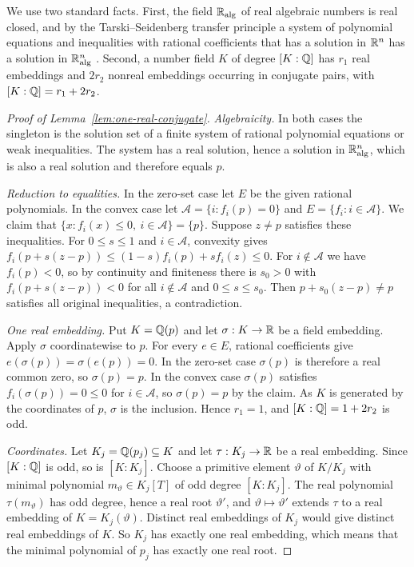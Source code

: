 We use two standard facts. First, the field $\mathbb R_{\mathrm{alg}}$ of real
algebraic numbers is real closed, and by the Tarski--Seidenberg transfer
principle a system of polynomial equations and inequalities with rational
coefficients that has a solution in $\mathbb R^n$ has a solution in
$\mathbb R_{\mathrm{alg}}^n$ \cite[Theorem~2.80 and Corollary~2.83]{BasuPollackRoy2006}.
Second, a number field $K$ of degree $[K:\mathbb Q]$ has $r_1$ real embeddings and
$2r_2$ nonreal embeddings occurring in conjugate pairs, with
$[K:\mathbb Q]=r_1+2r_2$.

\begin{proof}[Proof of Lemma~\ref{lem:one-real-conjugate}]
\emph{Algebraicity.} In both cases the singleton is the solution set of a
finite system of rational polynomial equations or weak inequalities. The
system has a real solution, hence a solution in $\mathbb R_{\mathrm{alg}}^n$, which
is also a real solution and therefore equals $p$.

\emph{Reduction to equalities.} In the zero-set case let $E$ be the given
rational polynomials. In the convex case let
$\mathcal A=\{i:f_i(p)=0\}$ and $E=\{f_i:i\in\mathcal A\}$. We claim that
$\{x:f_i(x)\le0,\ i\in\mathcal A\}=\{p\}$. Suppose $z\ne p$ satisfies these
inequalities. For $0\le s\le1$ and $i\in\mathcal A$, convexity gives
$f_i(p+s(z-p))\le(1-s)f_i(p)+sf_i(z)\le0$. For $i\notin\mathcal A$ we have
$f_i(p)<0$, so by continuity and finiteness there is $s_0>0$ with
$f_i(p+s(z-p))<0$ for all $i\notin\mathcal A$ and $0\le s\le s_0$. Then
$p+s_0(z-p)\ne p$ satisfies all original inequalities, a contradiction.

\emph{One real embedding.} Put $K=\mathbb Q(p)$ and let $\sigma:K\to\mathbb R$ be a field
embedding. Apply $\sigma$ coordinatewise to $p$. For every $e\in E$, rational
coefficients give $e(\sigma(p))=\sigma(e(p))=0$. In the zero-set case
$\sigma(p)$ is therefore a real common zero, so $\sigma(p)=p$. In the convex
case $\sigma(p)$ satisfies $f_i(\sigma(p))=0\le0$ for $i\in\mathcal A$, so
$\sigma(p)=p$ by the claim. As $K$ is generated by the coordinates of $p$,
$\sigma$ is the inclusion. Hence $r_1=1$, and $[K:\mathbb Q]=1+2r_2$ is odd.

\emph{Coordinates.} Let $K_j=\mathbb Q(p_j)\subseteq K$ and let $\tau:K_j\to\mathbb R$ be
a real embedding. Since $[K:\mathbb Q]$ is odd, so is $[K:K_j]$. Choose a primitive
element $\vartheta$ of $K/K_j$ with minimal polynomial $m_\vartheta\in K_j[T]$
of odd degree $[K:K_j]$. The real polynomial $\tau(m_\vartheta)$ has odd
degree, hence a real root $\vartheta'$, and $\vartheta\mapsto\vartheta'$
extends $\tau$ to a real embedding of $K=K_j(\vartheta)$. Distinct real
embeddings of $K_j$ would give distinct real embeddings of $K$. So $K_j$ has
exactly one real embedding, which means that the minimal polynomial of $p_j$
has exactly one real root.
\end{proof}

